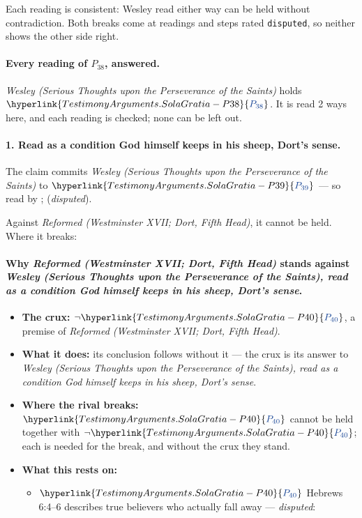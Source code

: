 \documentclass[11pt]{article}
\newcommand{\pvar}[2]{\hyperlink{#1-P#2}{\textcolor{claimlink}{P_{#2}}}}
\begin{document}
Each reading is consistent: Wesley read either way can be held without contradiction. Both breaks come at readings and steps rated \texttt{disputed}, so neither shows the other side right.

\paragraph{Every reading of \(P_{38}\), answered.} \emph{Wesley (Serious Thoughts upon the Perseverance of the Saints)} holds \(\pvar{TestimonyArguments.SolaGratia}{38}\). It is read 2 ways here, and each reading is checked; none can be left out.

\paragraph{1. Read as a condition God himself keeps in his sheep, Dort’s sense.} The claim commits \emph{Wesley (Serious Thoughts upon the Perseverance of the Saints)} to \(\pvar{TestimonyArguments.SolaGratia}{39}\) --- so read by \cite[593]{schaff-creeds-christendom-3-1977}; \cite[415--416]{calvin-commentary-john-1847} (\emph{disputed}).

Against \emph{Reformed (Westminster XVII; Dort, Fifth Head)}, it cannot be held. Where it breaks:
\paragraph{Why \emph{Reformed (Westminster XVII; Dort, Fifth Head)} stands against \emph{Wesley (Serious Thoughts upon the Perseverance of the Saints), read as a condition God himself keeps in his sheep, Dort’s sense}.}
\begin{itemize}
\item \textbf{The crux:} \(\lnot \pvar{TestimonyArguments.SolaGratia}{40}\), a premise of \emph{Reformed (Westminster XVII; Dort, Fifth Head)}.
\item \textbf{What it does:} its conclusion follows without it --- the crux is its answer to \emph{Wesley (Serious Thoughts upon the Perseverance of the Saints), read as a condition God himself keeps in his sheep, Dort’s sense}.
\item \textbf{Where the rival breaks:} \(\pvar{TestimonyArguments.SolaGratia}{40}\) cannot be held together with \(\lnot \pvar{TestimonyArguments.SolaGratia}{40}\); each is needed for the break, and without the crux they stand.
\item \textbf{What this rests on:}
\begin{itemize}
\item \(\pvar{TestimonyArguments.SolaGratia}{40}\) Hebrews 6:4–6 describes true believers who actually fall away --- \emph{disputed}: \cite[137--138]{calvin-hebrews-1853}
\end{itemize}
\end{itemize}
\end{document}
